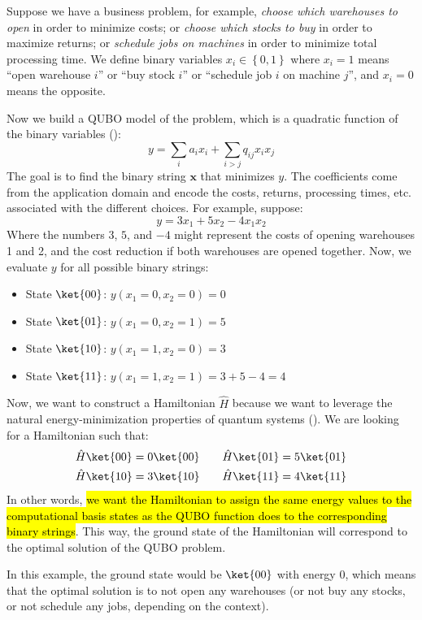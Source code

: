 \highspace
\begin{examplebox}
    Suppose we have a business problem, for example, \emph{choose which warehouses to open} in order to minimize costs; or \emph{choose which stocks to buy} in order to maximize returns; or \emph{schedule jobs on machines} in order to minimize total processing time. We define binary variables $x_i \in \left\{0,1\right\}$ where $x_i = 1$ means ``open warehouse $i$'' or ``buy stock $i$'' or ``schedule job $i$ on machine $j$'', and $x_i = 0$ means the opposite.

    \highspace
    Now we build a QUBO model of the problem, which is a quadratic function of the binary variables ():
    \begin{equation*}
        y = \sum_{i} a_{i} x_{i} + \sum_{i > j} q_{ij} x_{i} x_{j}
    \end{equation*}
    The goal is to find the binary string $\mathbf{x}$ that minimizes $y$. The coefficients come from the application domain and encode the costs, returns, processing times, etc. associated with the different choices. For example, suppose:
    \begin{equation*}
        y = 3 x_1 + 5 x_2 - 4 x_1 x_2
    \end{equation*}
    Where the numbers $3$, $5$, and $-4$ might represent the costs of opening warehouses 1 and 2, and the cost reduction if both warehouses are opened together. Now, we evaluate $y$ for all possible binary strings:
    \begin{itemize}
        \item State $\ket{00}$: $y(x_1 = 0, x_2 = 0) = 0$
        \item State $\ket{01}$: $y(x_1 = 0, x_2 = 1) = 5$
        \item State $\ket{10}$: $y(x_1 = 1, x_2 = 0) = 3$
        \item State $\ket{11}$: $y(x_1 = 1, x_2 = 1) = 3+5-4 = 4$
    \end{itemize}
    Now, we want to construct a Hamiltonian $\hat{H}$ because we want to leverage the natural energy-minimization properties of quantum systems (). We are looking for a Hamiltonian such that:
    \begin{gather*}
        \hat{H} \ket{00} = 0 \ket{00} \qquad \hat{H} \ket{01} = 5 \ket{01} \\
        \hat{H} \ket{10} = 3 \ket{10} \qquad \hat{H} \ket{11} = 4 \ket{11}
    \end{gather*}
    In other words, \hl{we want the Hamiltonian to assign the same energy values to the computational basis states as the QUBO function does to the corresponding binary strings}. This way, the ground state of the Hamiltonian will correspond to the optimal solution of the QUBO problem.
    
    \highspace
    In this example, the ground state would be $\ket{00}$ with energy $0$, which means that the optimal solution is to not open any warehouses (or not buy any stocks, or not schedule any jobs, depending on the context).
\end{examplebox}

